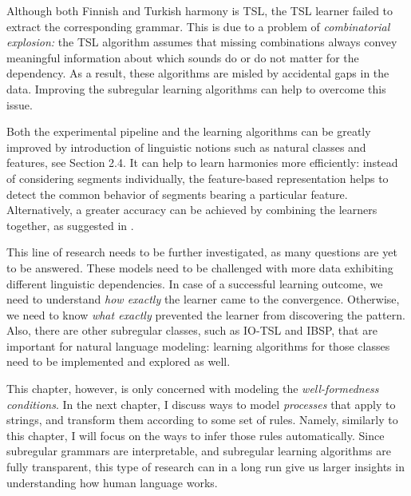 Although both Finnish and Turkish harmony is TSL, the TSL learner failed to extract the corresponding grammar.
This is due to a problem of \emph{combinatorial explosion:} the TSL algorithm assumes that missing combinations always convey meaningful information about which sounds do or do not matter for the dependency.
As a result, these algorithms are misled by accidental gaps in the data.
Improving the subregular learning algorithms can help to overcome this issue.


Both the experimental pipeline and the learning algorithms can be greatly improved by introduction of linguistic notions such as natural classes and features, see Section 2.4.
It can help to learn harmonies more efficiently: instead of considering segments individually, the feature-based representation helps to detect the common behavior of segments bearing a particular feature.
Alternatively, a greater accuracy can be achieved by combining the learners together, as suggested in \cite{Heinz10ldp,HeinzIdsardi13}.



This line of research needs to be further investigated, as many questions are yet to be answered.
These models need to be challenged with more data exhibiting different linguistic dependencies.
In case of a successful learning outcome, we need to understand \emph{how exactly} the learner came to the convergence.
Otherwise, we need to know \emph{what exactly} prevented the learner from discovering the pattern.
Also, there are other subregular classes, such as IO-TSL and IBSP, that are important for natural language modeling: learning algorithms for those classes need to be implemented and explored as well.

This chapter, however, is only concerned with modeling the \emph{well-formedness conditions}.
In the next chapter, I discuss ways to model \emph{processes} that apply to strings, and transform them according to some set of rules.
Namely, similarly to this chapter, I will focus on the ways to infer those rules automatically.
Since subregular grammars are interpretable, and subregular learning algorithms are fully transparent, this type of research can in a long run give us larger insights in understanding how human language works.